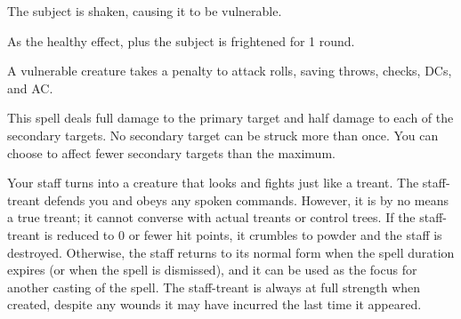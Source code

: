 \spellrng{\rngclose}
\begin{spellhealthy}
  The subject is shaken, causing it to be vulnerable.
\end{spellhealthy}
\begin{spellblood}
  As the healthy effect, plus the subject is frightened for 1 round.
\end{spellblood}
\begin{spellnotes}
  A vulnerable creature takes a  penalty to attack rolls, saving throws, checks, DCs, and AC.
\end{spellnotes}

\spellrng{\rngmed}
\begin{spelleffect}
  This spell deals full damage to the primary target and half damage to each of the secondary targets. No secondary target can be struck more than once. You can choose to affect fewer secondary targets than the maximum.
\end{spelleffect}

\spellrng{\rngtouch}
\begin{spelleffect}
  Your staff turns into a creature that looks and fights just like a treant. The staff-treant defends you and obeys any spoken commands. However, it is by no means a true treant; it cannot converse with actual treants or control trees. If the staff-treant is reduced to 0 or fewer hit points, it crumbles to powder and the staff is destroyed. Otherwise, the staff returns to its normal form when the spell duration expires (or when the spell is dismissed), and it can be used as the focus for another casting of the spell. The staff-treant is always at full strength when created, despite any wounds it may have incurred the last time it appeared.
\end{spelleffect}

